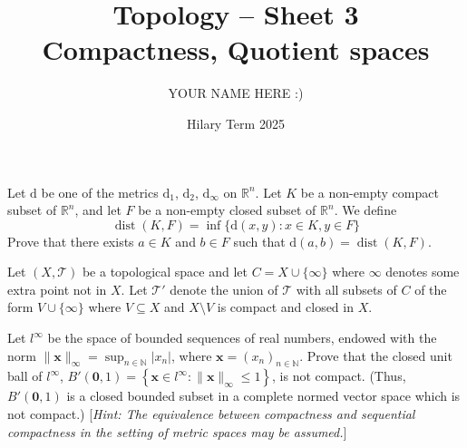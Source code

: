 \documentclass[answers]{exam}
\title{Topology -- Sheet 3\\Compactness, Quotient spaces}
\author{YOUR NAME HERE :)}
\date{Hilary Term 2025}
\begin{document}
\maketitle

\begin{questions}

\question%
Let $\mathrm d$ be one of the metrics $\mathrm{d}_{1}$, $\mathrm{d}_{2}$, $\mathrm{d}_{\infty}$ on $\mathbb{R}^{n}$. Let $K$ be a non-empty compact subset of $\mathbb{R}^{n}$, and let $F$ be a non-empty closed subset of $\mathbb{R}^{n}$. We define \[
	\operatorname{dist}(K, F)=\inf \{\mathrm{d}(x, y): x \in K, y \in F\}
\] Prove that there exists $a \in K$ and $b \in F$ such that $\mathrm{d}(a, b)=\operatorname{dist}(K, F)$.



\question%
Let $(X, \mathcal{T})$ be a topological space and let $C=X \cup\{\infty\}$ where $\infty$ denotes some extra point not in $X$. Let $\mathcal{T}'$ denote the union of $\mathcal{T}$ with all subsets of $C$ of the form $V \cup\{\infty\}$ where $V \subseteq X$ and $X \setminus V$ is compact and closed in $X$.



\question%
Let $l^{\infty}$ be the space of bounded sequences of real numbers, endowed with the norm $\|\mathbf{x}\|_{\infty}=\sup _{n \in \mathbb{N}}|x_{n}|$, where $\mathbf{x}=(x_{n})_{n \in \mathbb{N}}$. Prove that the closed unit ball of $l^{\infty}$, $B'(\mathbf{0}, 1)=\left\{\mathbf{x} \in l^{\infty}: \|\mathbf{x}\|_{\infty} \leq 1\right\}$, is not compact. (Thus, $B'(\mathbf{0}, 1)$ is a closed bounded subset in a complete normed vector space which is not compact.) [\emph{Hint: The equivalence between compactness and sequential compactness in the setting of metric spaces may be assumed.}]




\end{questions}
\end{document}
